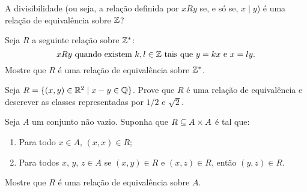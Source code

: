 \documentclass[12pt]{exam}
\begin{document}
    \vspace{.3cm}

    \questao{} A divisibilidade (ou seja, a rela{\c c}{\~a}o definida por $xRy$ se, e s{\'o}
    se, $x \mid y$) {\'e} uma rela{\c c}{\~a}o de equival{\^e}ncia sobre $\mathbb{Z}$?

    \vspace{.3cm}

    \questao{} Seja $R$ a seguinte rela{\c c}{\~a}o sobre $\mathbb{Z}^*$:
    \[
        x R y \mbox{ quando existem }  k, l \in \mathbb{Z} \mbox{ tais que } y = kx \mbox{ e } x = ly.
    \]
    Mostre que $R$ {\'e} uma rela{\c c}{\~a}o de equival{\^e}ncia sobre $\mathbb{Z}^*$.

    \vspace{.3cm}

    \questao{} Seja $R = \{ (x, y) \in \mathbb{R}^2 \mid x - y \in \mathbb{Q}\}$. Prove que $R$ {\'e} uma rela{\c c}{\~a}o de equival{\^e}ncia e descrever as classes representadas por $1/2$ e $\sqrt{2}$.

    \vspace{.3cm}

    \questao{} Seja $A$ um conjunto n\~ao vazio. Suponha que $R \subseteq A \times A$ \'e tal que:
    \begin{enumerate}[label={\alph*})]
        \item Para todo $x \in A$, $(x,x) \in R$;
        \item Para todos $x$, $y$, $z \in A$ se $(x, y) \in R$ e $(x,z) \in R$, ent\~ao $(y,z) \in R$.
    \end{enumerate}
    Mostre que $R$ \'e uma rela\c{c}\~ao de equival\^encia sobre $A$.
\end{document}
